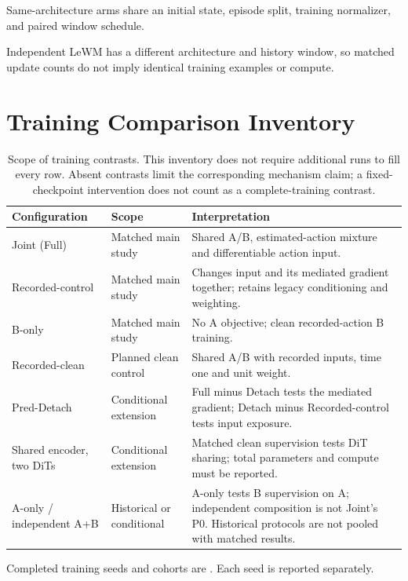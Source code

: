 Same-architecture arms share an initial state, episode split, training normalizer, and paired window schedule.

Independent LeWM has a different architecture and history window, so matched update counts do not imply identical training examples or compute.

\section{Training Comparison Inventory}
\label{app:coupling}
\begin{table}[t]
\centering\small
\begin{tabular}{p{}p{}p{}}
\toprule
Configuration & Scope & Interpretation \\
\midrule
Joint (Full) & Matched main study & Shared A/B, estimated-action mixture and differentiable action input. \\
Recorded-control & Matched main study & Changes input and its mediated gradient together; retains legacy conditioning and weighting. \\
B-only & Matched main study & No A objective; clean recorded-action B training. \\
Recorded-clean & Planned clean control & Shared A/B with recorded inputs, time one and unit weight. \\
Pred-Detach & Conditional extension & Full minus Detach tests the mediated gradient; Detach minus Recorded-control tests input exposure. \\
Shared encoder, two DiTs & Conditional extension & Matched clean supervision tests DiT sharing; total parameters and compute must be reported. \\
A-only / independent A+B & Historical or conditional & A-only tests B supervision on A; independent composition is not Joint's P0. Historical protocols are not pooled with matched results. \\
\bottomrule
\end{tabular}
\caption{Scope of training contrasts. This inventory does not require additional runs to fill every row. Absent contrasts limit the corresponding mechanism claim; a fixed-checkpoint intervention does not count as a complete-training contrast.}
\label{tab:ablation_design}
\end{table}

Completed training seeds and cohorts are . Each seed is reported separately.

